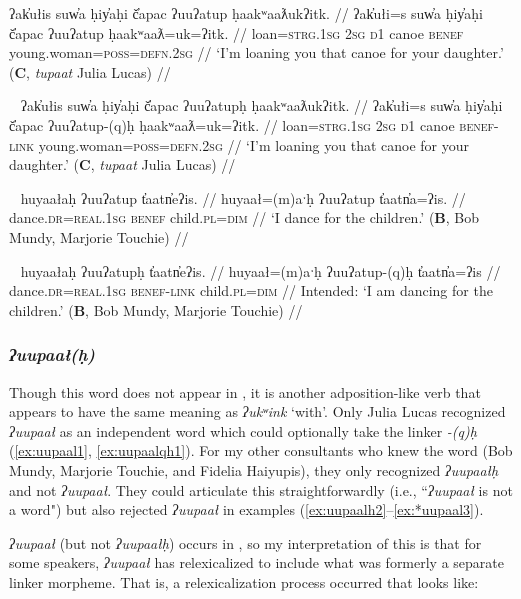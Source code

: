 \ex \label{ex:uatup}
\begingl
\glpreamble ʔak̓ułis suw̓a ḥiy̓aḥi č̓apac ʔuuʔatup ḥaakʷaaƛukʔitk. //
\gla ʔak̓ułi=s suw̓a ḥiy̓aḥi č̓apac ʔuuʔatup ḥaakʷaaƛ=uk=ʔitk. //
\glb loan=\textsc{strg.1sg} \textsc{2sg} \textsc{d1} canoe \textsc{benef} young.woman=\textsc{poss}=\textsc{defn.2sg} //
\glft `I'm loaning you that canoe for your daughter.' (\textbf{C}, \textit{tupaat} Julia Lucas) //
\endgl
\xe

\ex~ \label{ex:uatuph}
\begingl
\glpreamble ʔak̓ułis suw̓a ḥiy̓aḥi č̓apac ʔuuʔatupḥ ḥaakʷaaƛukʔitk. //
\gla ʔak̓ułi=s suw̓a ḥiy̓aḥi č̓apac ʔuuʔatup-(q)ḥ ḥaakʷaaƛ=uk=ʔitk. //
\glb loan=\textsc{strg.1sg} \textsc{2sg} \textsc{d1} canoe \textsc{benef}-\textsc{link} young.woman=\textsc{poss}=\textsc{defn.2sg} //
\glft `I'm loaning you that canoe for your daughter.' (\textbf{C}, \textit{tupaat} Julia Lucas) //
\endgl
\xe

\ex~ \label{ex:uatup2}
\begingl
\glpreamble huyaałaḥ ʔuuʔatup t̓aatn̓eʔis. //
\gla huyaał=(m)aˑḥ ʔuuʔatup t̓aatn̓a=ʔis. //
\glb dance.\textsc{dr}=\textsc{real.1sg} \textsc{benef} child.\textsc{pl}=\textsc{dim} //
\glft `I dance for the children.' (\textbf{B}, Bob Mundy, Marjorie Touchie) //
\endgl
\xe

\ex~ \label{ex:uatuph2}
\begingl
\glpreamble *huyaałaḥ ʔuuʔatupḥ t̓aatn̓eʔis. //
\gla huyaał=(m)aˑḥ ʔuuʔatup-(q)ḥ t̓aatn̓a=ʔis //
\glb dance.\textsc{dr}=\textsc{real.1sg} \textsc{benef}-\textsc{link} child.\textsc{pl}=\textsc{dim} //
\glft Intended: `I am dancing for the children.' (\textbf{B}, Bob Mundy, Marjorie Touchie) //
\endgl
\xe

\subsubsection{\textit{ʔuupaał(ḥ)}} Though this word does not appear in \citet{woo2007b}, it is another adposition-like verb that appears to have the same meaning as \textit{ʔukʷink} `with'. Only Julia Lucas recognized \textit{ʔuupaał} as an independent word which could optionally take the linker \textit{-(q)ḥ} (\ref{ex:uupaal1}, \ref{ex:uupaalqh1}). For my other consultants who knew the word (Bob Mundy, Marjorie Touchie, and Fidelia Haiyupis), they only recognized \textit{ʔuupaałḥ} and not \textit{ʔuupaał}. They could articulate this straightforwardly (i.e., ``\textit{ʔuupaał} is not a word") but also rejected \textit{ʔuupaał} in examples (\ref{ex:uupaalh2}--\ref{ex:*uupaal3}).

\textit{ʔuupaał} (but not \textit{ʔuupaałḥ}) occurs in \citet{sapir1939, sapir1955}, so my interpretation of this is that for some speakers, \textit{ʔuupaał} has relexicalized to include what was formerly a separate linker morpheme. That is, a relexicalization process occurred that looks like:

